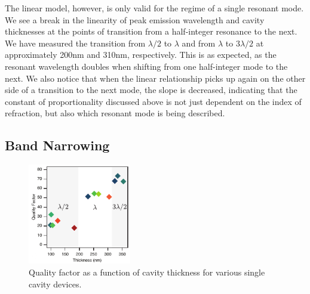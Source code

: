 \documentclass{report}
\begin{document}
            The linear model, however, is only valid for the regime of a single resonant mode. We see a break in the linearity of peak emission wavelength and cavity thicknesses at the points of transition from a half-integer resonance to the next. We have measured the transition from $\lambda/2$ to $\lambda$ and from $\lambda$ to $3\lambda/2$ at approximately 200nm and 310nm, respectively. This is as expected, as the resonant wavelength doubles when shifting from one half-integer mode to the next. We also notice that when the linear relationship picks up again on the other side of a transition to the next mode, the slope is decreased, indicating that the constant of proportionality discussed above is not just dependent on the index of refraction, but also which resonant mode is being described.
        
        \subsection{Band Narrowing} \label{bandwidth}
            \begin{figure}
                \centering
                \vspace{-0.5cm}
                \includegraphics[width=0.4\textwidth]{images/n1_quality_factor.png}
                \caption{\small Quality factor as a function of cavity thickness for various single cavity devices.}
                \label{fig:bandwidth}
                \vspace{1cm}
            \end{figure}
\end{document}
